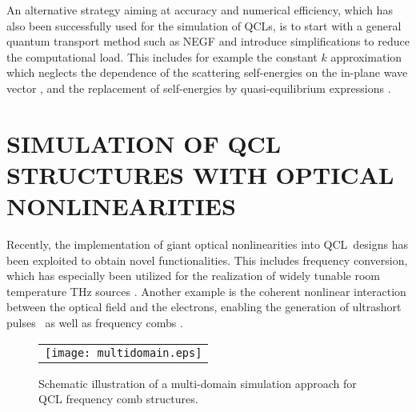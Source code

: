 \documentclass[a4paper]{spie}%
\begin{document}
An alternative strategy aiming at accuracy and numerical efficiency, which has
also been successfully used for the simulation of QCLs, is to start with a
general quantum transport method such as NEGF and introduce simplifications to
reduce the computational load. This includes for example the constant $k$
approximation which neglects the dependence of the scattering self-energies on
the in-plane wave vector \cite{Kubis_assess,Wacker_JSTQE}, and the replacement
of self-energies by quasi-equilibrium expressions \cite{greck2015efficient}.

\section{SIMULATION OF QCL STRUCTURES WITH OPTICAL NONLINEARITIES}

\label{sec:nonl}

Recently, the implementation of giant optical nonlinearities into QCL\ designs
has been exploited to obtain novel functionalities. This includes frequency
conversion, which has especially been utilized for the realization of widely
tunable room temperature THz sources
\cite{belkin2008room,lu2012widely,vijayraghavan2013broadly,lu2014continuous}.
Another example is the coherent nonlinear interaction between the optical
field and the electrons, enabling the generation of ultrashort
pulses~\cite{wang2009mode,barbieri2011coherent,revin2016active} as well as
frequency combs
\cite{2012Natur.492..229H,burghoff2014terahertz,wienold2014evidence,rosch2015octave}%
.

\begin{figure}[th]
\begin{center}%
\begin{tabular}
[c]{c}%
\texttt{[image: multidomain.eps]}%
\end{tabular}
\end{center}
\caption[example]{Schematic illustration of a multi-domain simulation approach
for QCL frequency comb structures.}%
\label{fig:scheme}%
\end{figure}
\end{document}
